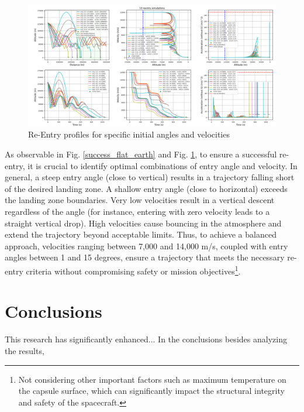 \documentclass[runningheads]{llncs}
\begin{document}
\begin{figure}
\centering
\includegraphics[width=1\textwidth]{images/sim_results_sample.png}
\caption{Re-Entry profiles for specific initial angles and velocities} \label{sim_results_sample}
\end{figure}

As observable in Fig. \ref{success_flat_earth} and Fig. \ref{sim_results_sample}, to ensure a successful re-entry, it is crucial to identify optimal combinations of entry angle and velocity. In general, a steep entry angle (close to vertical) results in a trajectory falling short of the desired landing zone. A shallow entry angle (close to horizontal) exceeds the landing zone boundaries. Very low velocities result in a vertical descent regardless of the angle (for instance, entering with zero velocity leads to a straight vertical drop). High velocities cause bouncing in the atmosphere and extend the trajectory beyond acceptable limits.
Thus, to achieve a balanced approach, velocities ranging between 7,000 and 14,000 m/s, coupled with entry angles between 1 and 15 degrees, ensure a trajectory that meets the necessary re-entry criteria without compromising safety or mission objectives\footnote{Not considering other important factors such as maximum temperature on the capsule surface, which can significantly impact the structural integrity and safety of the spacecraft.}.







\section{Conclusions}
This research has significantly enhanced...
In the conclusions besides analyzing the results,
\end{document}
